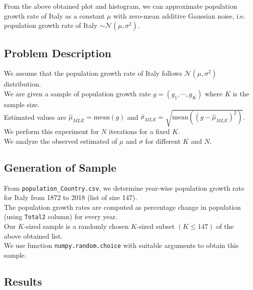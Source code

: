 \documentclass[fleqn, 11pt]{article}
\begin{document}
From the above obtained plot and histogram, we can approximate population growth rate of Italy as a constant $\mu$ with zero-mean additive Gaussian noise, i.e. population growth rate of Italy $\sim \mathcal{N}(\mu, \sigma^2)$. \\

\subsection{Problem Description}
We assume that the population growth rate of Italy follows $\mathcal{N}(\mu, \sigma^2)$ distribution. \\
We are given a sample of population growth rate $g = (g_1, \cdots ,g_K)$ where $K$ is the sample size. \\
Estimated values are $\hat{\mu}_{MLE} = \mathrm{mean}(g)$ and $\hat{\sigma}_{MLE} = \sqrt{ \mathrm{mean}((g - \hat{\mu}_{MLE})^2) }$. \\
We perform this experiment for $N$ iterations for a fixed $K$. \\
We analyze the observed estimated of $\mu$ and $\sigma$ for different $K$ and $N$. \\

\subsection{Generation of Sample}
From \verb!population_Country.csv!, we determine year-wise population growth rate for Italy from 1872 to 2018 (list of size 147). \\
The population growth rates are computed as percentage change in population (using \verb!Total2! column) for every year. \\
Our $K$-sized sample is a randomly chosen $K$-sized subset $(K \le 147)$ of the above obtained list. \\
We use function \verb!numpy.random.choice! with suitable arguments to obtain this sample. \\

\subsection{Results}
\end{document}
